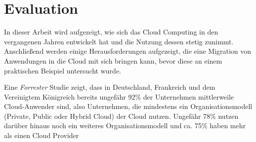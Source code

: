 \section{Evaluation}
In dieser Arbeit wird aufgezeigt, wie sich das Cloud Computing in den vergangenen Jahren entwickelt hat und die Nutzung dessen stetig zunimmt. Anschließend werden einige Herausforderungen aufgezeigt, die eine Migration von Anwendungen in die Cloud mit sich bringen kann, bevor diese an einem praktischen Beispiel untersucht wurde.

Eine \textit{Forrester} Studie zeigt, dass in Deutschland, Frankreich und dem Vereinigtem Königreich bereits ungefähr 92\% der Unternehmen mittlerweile Cloud-Anwender sind, also Unternehmen, die mindestens ein Organisationsmodell (Private, Public oder Hybrid Cloud) der Cloud nutzen. Ungefähr 78\% nutzen darüber hinaus noch ein weiteres Organisationsmodell und ca. 75\% haben mehr als einen Cloud Provider \cite[Vgl.][S. 4]{Rajamani2022} \pagebreak